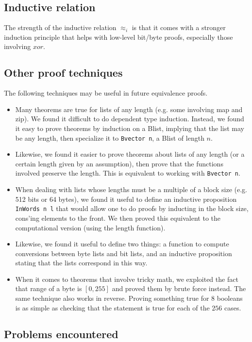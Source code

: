 \documentclass[twocolumn,showpacs,%
  nofootinbib,aps,superscriptaddress,%
  eqsecnum,prd,notitlepage,showkeys,10pt]{revtex4-1}
\begin{document}
\subsection{Inductive relation}
The strength of the inductive relation $\approx_i$ is that it comes with a stronger induction principle that helps with low-level bit/byte proofs, especially those involving $xor$.

\subsection{Other proof techniques}

The following techniques may be useful in future equivalence proofs.

\begin{itemize}
\item Many theorems are true for lists of any length (e.g. some involving map and zip). We found it difficult to do dependent type induction. Instead, we found it easy to prove theorems by induction on a Blist, implying that the list may be any length, then specialize it to \verb|Bvector n|, a Blist of length $n$. 
\item Likewise, we found it easier to prove theorems about lists of any length (or a certain length given by an assumption), then prove that the functions involved preserve the length. This is equivalent to working with \verb|Bvector n|.
\item When dealing with lists whose lengths must be a multiple of a block size (e.g. 512 bits or 64 bytes), we found it useful to define an inductive proposition \verb|InWords n l| that would allow one to do proofs by inducting in the block size, cons'ing elements to the front. We then proved this equivalent to the computational version (using the length function).
\item Likewise, we found it useful to define two things: a function to compute conversions between byte lists and bit lists, and an inductive proposition stating that the lists correspond in this way.
\item When it comes to theorems that involve tricky math, we exploited the fact that range of a byte is $[0, 255]$ and proved them by brute force instead. The same technique also works in reverse. Proving something true for $8$ booleans is as simple as checking that the statement is true for each of the $256$ cases.
\end{itemize}

\subsection{Problems encountered}
\end{document}
